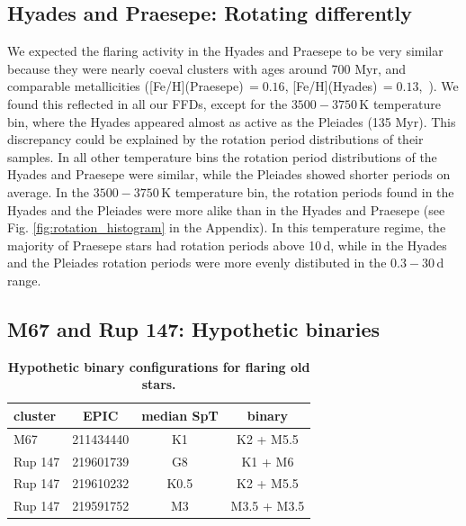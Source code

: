 \documentclass{aa}
\begin{document}
\subsection{Hyades and Praesepe: Rotating differently}
We expected the flaring activity in the Hyades and Praesepe to be very similar because they were nearly coeval clusters with ages around 700 Myr, and comparable metallicities ([Fe/H](Praesepe)\,$=0.16$, [Fe/H](Hyades)\,$=0.13$,~\citealt{netopil_metallicities_2016}). We found this reflected in all our FFDs, except for the $3500-3750$\,K temperature bin, where the Hyades appeared almost as active as the Pleiades (135 Myr). This discrepancy could be explained by the rotation period distributions of their samples. In all other temperature bins the rotation period distributions of the Hyades and Praesepe were similar, while the Pleiades showed shorter periods on average. In the $3500-3750$\,K temperature bin, the rotation periods found in the Hyades and the Pleiades were more alike than in the Hyades and Praesepe (see Fig. \ref{fig:rotation_histogram} in the Appendix). In this temperature regime, the majority of Praesepe stars had rotation periods above 10\,d, while in the Hyades and the Pleiades rotation periods were more evenly distibuted in the $0.3-30$\,d range.
\subsection{M67 and Rup 147: Hypothetic binaries}
\begin{table}

\caption{\textbf{Hypothetic binary configurations for flaring old stars.}}
\label{tab:m67_rup147_binaries}
\centering
\begin{tabular}{lccc}
\hline
 cluster & EPIC & median SpT &     binary \\
\hline
     M67 &  211434440 &         K1 &    K2 + M5.5 \\
 Rup 147 &  219601739 &         G8 &      K1 + M6 \\
 Rup 147 &  219610232 &       K0.5 &    K2 + M5.5 \\
 Rup 147 &  219591752 &         M3 &  M3.5 + M3.5 \\
\hline
\end{tabular}
\end{table}
\end{document}
